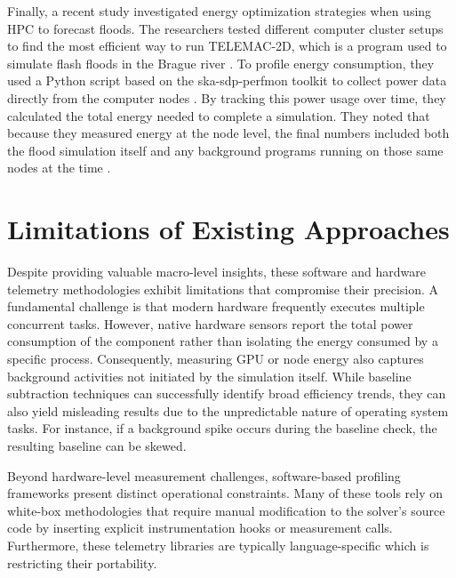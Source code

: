 Finally, a recent study investigated energy optimization strategies when using HPC to forecast floods. The researchers tested different computer cluster setups to find the most efficient way to run TELEMAC-2D, which is a program used to simulate flash floods in the Brague river \cite{AhWoane2025}. To profile energy consumption, they used a Python script based on the ska-sdp-perfmon toolkit to collect power data directly from the computer nodes \cite{AhWoane2025}. By tracking this power usage over time, they calculated the total energy needed to complete a simulation. They noted that because they measured energy at the node level, the final numbers included both the flood simulation itself and any background programs running on those same nodes at the time \cite{AhWoane2025}.

\section{Limitations of Existing Approaches}
\label{sec:limitations-related-work}

Despite providing valuable macro-level insights, these software and hardware telemetry methodologies exhibit limitations that compromise their precision. A fundamental challenge is that modern hardware frequently executes multiple concurrent tasks. However, native hardware sensors report the total power consumption of the component rather than isolating the energy consumed by a specific process. Consequently, measuring GPU or node energy also captures background activities not initiated by the simulation itself. While baseline subtraction techniques can successfully identify broad efficiency trends, they can also yield misleading results due to the unpredictable nature of operating system tasks. For instance, if a background spike occurs during the baseline check, the resulting baseline can be skewed.

Beyond hardware-level measurement challenges, software-based profiling frameworks present distinct operational constraints. Many of these tools rely on white-box methodologies that require manual modification to the solver's source code by inserting explicit instrumentation hooks or measurement calls. Furthermore, these telemetry libraries are typically language-specific which is restricting their portability.